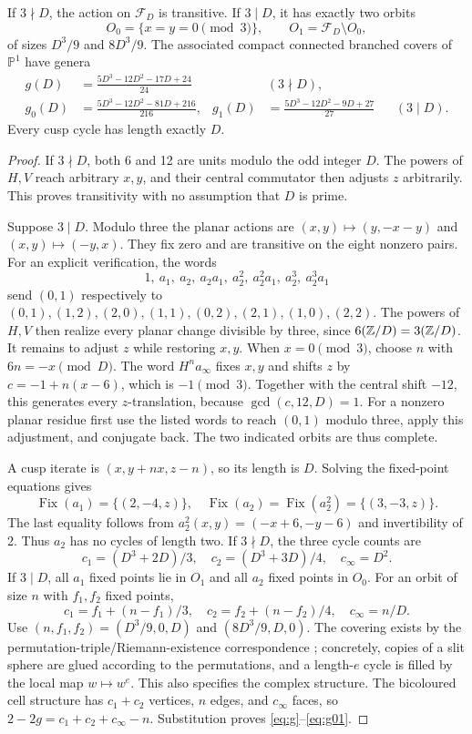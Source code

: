 \begin{theorem}\label{thm:orbits}
If $3\nmid D$, the action on $\mathcal F_D$ is transitive. If $3\mid D$,
it has exactly two orbits
\[
 O_0=\{x=y=0\pmod3\},\qquad O_1=\mathcal F_D\setminus O_0,
\]
of sizes $D^3/9$ and $8D^3/9$.
The associated compact connected branched covers of $\mathbb P^1$ have genera
\begin{align}
 g(D)&=\frac{5D^3-12D^2-17D+24}{24} &&(3\nmid D),\label{eq:g}\\
 g_0(D)&=\frac{5D^3-12D^2-81D+216}{216},&
 g_1(D)&=\frac{5D^3-12D^2-9D+27}{27} &&(3\mid D).\label{eq:g01}
\end{align}
Every cusp cycle has length exactly $D$.
\end{theorem}
\begin{proof}
If $3\nmid D$, both 6 and 12 are units modulo the odd integer $D$.
The powers of $H,V$ reach arbitrary $x,y$, and their central commutator
then adjusts $z$ arbitrarily. This proves transitivity with no assumption
that $D$ is prime.

Suppose $3\mid D$. Modulo three the planar actions are
$(x,y)\mapsto(y,-x-y)$ and $(x,y)\mapsto(-y,x)$.
They fix zero and are transitive on the eight nonzero pairs. For an explicit
verification, the words
\[
 1,\ a_1,\ a_2,\ a_2a_1,\ a_2^2,\ a_2^2a_1,\ a_2^3,\ a_2^3a_1
\]
send $(0,1)$ respectively to
$(0,1),(1,2),(2,0),(1,1),(0,2),(2,1),(1,0),(2,2)$.
The powers of $H,V$ then realize every planar change divisible by three,
since $6(\mathbb Z/D)=3(\mathbb Z/D)$.
It remains to adjust $z$ while restoring $x,y$. When $x=0\pmod3$, choose
$n$ with $6n=-x\pmod D$. The word $H^na_\infty$ fixes $x,y$ and shifts
$z$ by $c=-1+n(x-6)$, which is $-1\pmod3$.
Together with the central shift $-12$, this generates every $z$-translation,
because $\gcd(c,12,D)=1$. For a nonzero planar residue first use the
listed words to reach $(0,1)$ modulo three, apply this adjustment, and
conjugate back. The two indicated orbits are thus complete.

A cusp iterate is $(x,y+nx,z-n)$, so its length is $D$.
Solving the fixed-point equations gives
\[
 \operatorname{Fix}(a_1)=\{(2,-4,z)\},\quad
 \operatorname{Fix}(a_2)=\operatorname{Fix}(a_2^2)=\{(3,-3,z)\}.
\]
The last equality follows from $a_2^2(x,y)=(-x+6,-y-6)$ and invertibility
of 2. Thus $a_2$ has no cycles of length two. If $3\nmid D$, the three
cycle counts are
\[
 c_1=(D^3+2D)/3,\quad c_2=(D^3+3D)/4,\quad c_\infty=D^2.
\]
If $3\mid D$, all $a_1$ fixed points lie in $O_1$ and all $a_2$ fixed
points in $O_0$. For an orbit of size $n$ with $f_1,f_2$ fixed points,
\[
 c_1=f_1+(n-f_1)/3,\quad
 c_2=f_2+(n-f_2)/4,\quad c_\infty=n/D.
\]
Use $(n,f_1,f_2)=(D^3/9,0,D)$ and $(8D^3/9,D,0)$.
The covering exists by the permutation-triple/Riemann-existence
correspondence \cite[Introduction and \S1]{sv}; concretely, copies of a slit
sphere are glued according to the permutations, and a length-$e$ cycle is
filled by the local map $w\mapsto w^e$. This also specifies the complex
structure. The bicoloured cell structure has $c_1+c_2$ vertices, $n$ edges,
and $c_\infty$ faces, so $2-2g=c_1+c_2+c_\infty-n$.
Substitution proves \eqref{eq:g}--\eqref{eq:g01}.
\end{proof}

